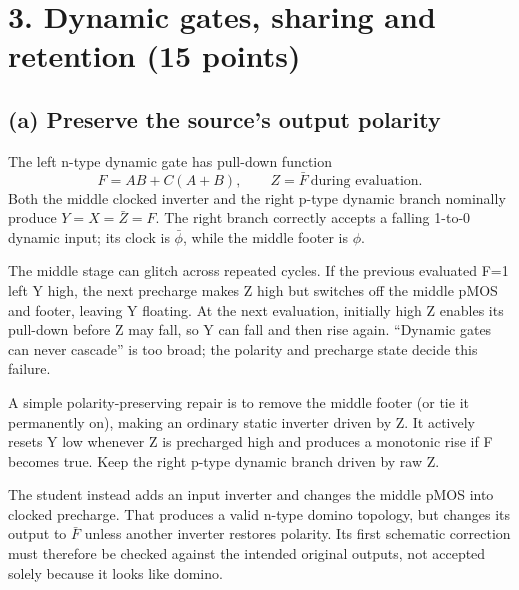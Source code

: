 \documentclass[10pt]{article}
\newcommand{\mos}[4]{\begin{scope}[shift={(#1,#2)}]
\draw (0,.24)--(0,-.24);\draw (0,.20)--(.25,.20)--(.25,.5);
\draw (0,-.20)--(.25,-.20)--(.25,-.5);\draw (-.16,.23)--(-.16,-.23);
\ifnum#4=1\draw (-.26,0) circle (.06);\draw (-.75,0)--(-.32,0);\else\draw (-.75,0)--(-.16,0);\fi
\node[anchor=east,font=\scriptsize] at (-.76,0) {$#3$};\end{scope}}
\newcommand{\ground}[2]{\draw (#1,#2)--(#1,{#2-.12});\draw ({#1-.17},{#2-.12})--({#1+.17},{#2-.12});\draw ({#1-.11},{#2-.20})--({#1+.11},{#2-.20});}
\newcommand{\rail}[3]{\draw (#1,#2)--(#1,{#2+.14});\node[above,font=\scriptsize] at (#1,{#2+.14}) {$#3$};}
\begin{document}
\newpage\section*{3. Dynamic gates, sharing and retention (15 points)}
\subsection*{(a) Preserve the source's output polarity}
The left n-type dynamic gate has pull-down function
\[F=AB+C(A+B),\qquad Z=\bar F\ \text{during evaluation}.\]
Both the middle clocked inverter and the right p-type dynamic branch nominally produce $Y=X=\bar Z=F$. The right branch correctly accepts a falling 1-to-0 dynamic input; its clock is $\bar\phi$, while the middle footer is $\phi$.

The middle stage can glitch across repeated cycles. If the previous evaluated F=1 left Y high, the next precharge makes Z high but switches off the middle pMOS and footer, leaving Y floating. At the next evaluation, initially high Z enables its pull-down before Z may fall, so Y can fall and then rise again. ``Dynamic gates can never cascade'' is too broad; the polarity and precharge state decide this failure.

A simple polarity-preserving repair is to remove the middle footer (or tie it permanently on), making an ordinary static inverter driven by Z. It actively resets Y low whenever Z is precharged high and produces a monotonic rise if F becomes true. Keep the right p-type dynamic branch driven by raw Z.
\begin{center}\end{center}
The student instead adds an input inverter and changes the middle pMOS into clocked precharge. That produces a valid n-type domino topology, but changes its output to $\bar F$ unless another inverter restores polarity. Its first schematic correction must therefore be checked against the intended original outputs, not accepted solely because it looks like domino.
\end{document}
